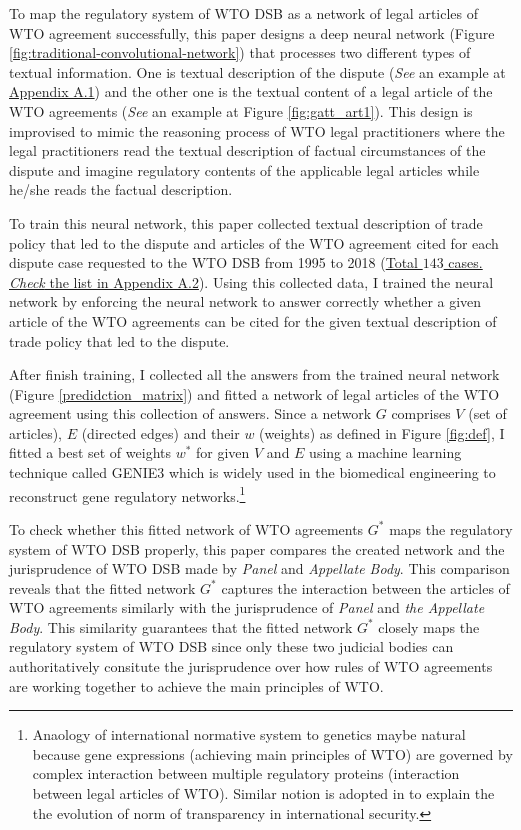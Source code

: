 To map the regulatory system of WTO DSB as 
a network of legal articles of WTO agreement 
successfully,
this paper designs a deep neural network (Figure \ref{fig:traditional-convolutional-network}) that
processes two different types of textual information.
One is textual description of the dispute (\textit{See} an example at \hyperref[sub:factual-aspect-example]{Appendix A.1}) and
the other one is the textual content of a legal article of the WTO agreements (\textit{See} an example at Figure \ref{fig:gatt_art1}).
This design is improvised to mimic
the reasoning process of WTO legal practitioners
where the legal practitioners read
the textual description of
factual circumstances of the dispute and imagine regulatory contents of
the applicable legal articles while he/she reads the factual description.


To train this neural network, this paper collected textual description of trade policy 
that led to the dispute and articles of the WTO agreement cited for each dispute
case requested to the WTO DSB 
from 1995 to 2018 (\hyperref[sub:cited-articles-table]{Total $143$ cases. \textit{Check} the list in Appendix A.2}).
Using this collected data, I trained the neural network by enforcing the neural network to answer correctly 
whether a given article of the WTO agreements
can be cited for the given textual description of 
trade policy that led to the dispute.

After finish training, I collected all the answers from the trained neural network (Figure \ref{predidction_matrix})
and fitted a network of legal articles of the WTO agreement
using this collection of answers.
Since a network $G$ comprises $V$ (set of articles), $E$ (directed edges) and their $w$ (weights) as defined in Figure \ref{fig:def}, 
I fitted a best set of weights $w^*$ for given $V$ and $E$
using a machine learning technique called GENIE3 \citep{genie3} 
which is widely used in the biomedical engineering to reconstruct gene regulatory networks.\footnote{Anaology of international normative system to genetics maybe natural because gene expressions (achieving main principles of WTO) are governed by complex interaction between multiple regulatory proteins (interaction between legal articles of WTO). Similar notion is adopted in \cite{gene_analogy} to explain the the evolution of norm of transparency in international security.}

To check whether this fitted network of WTO agreements $G^*$ maps the regulatory system of WTO DSB properly, this paper
compares the created network and the jurisprudence of WTO DSB made by \textit{Panel} and \textit{Appellate Body}. 
This comparison reveals that the fitted network $G^*$ captures the interaction between the articles of WTO agreements
similarly with the jurisprudence of \textit{Panel} and \textit{the Appellate Body}. This similarity guarantees that the fitted network $G^*$ closely maps the regulatory system of WTO DSB since only these two judicial bodies 
can authoritatively consitute the jurisprudence over how rules of WTO agreements are working together 
to achieve the main principles of WTO.

